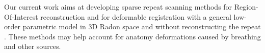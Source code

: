 Our current work aims at developing sparse repeat scanning methods for Region-Of-Interest reconstruction and  for deformable registration with a general low-order parametric
model in 3D Radon space and without reconstructing the repeat \cite{adelmanmsc2018}. These methods may help account for anatomy deformations caused by breathing and other sources. 






